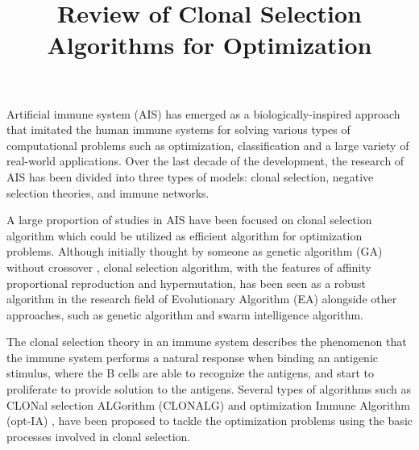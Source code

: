 \documentclass[12pt]{article}
\title{Review of Clonal Selection Algorithms for Optimization}
\date{}
\begin{document}
\onehalfspacing

\maketitle

Artificial immune system (AIS) has emerged as a biologically-inspired  approach that imitated the human immune systems for solving various types of computational problems such as optimization, classification and a large variety of real-world applications. \cite{Castro02ArtificialImmune, Zheng10ASurveyof} Over the last decade of the development, the research of AIS has been divided into three types of models: clonal selection, negative selection theories, and immune networks. \cite{Timmis08TheoreticalAdvances, Hart08Applicationareas}

A large proportion of studies in AIS have been focused on clonal selection algorithm which could be utilized as efficient algorithm for optimization problems. \cite{Timmis07Artificialimmune} Although initially thought by someone as genetic algorithm (GA) without crossover \cite{Hofmeyr00Architecturefor}, clonal selection algorithm, with the features of affinity proportional reproduction and hypermutation, has been seen as a robust algorithm in the research field of Evolutionary Algorithm (EA) alongside other approaches, such as genetic algorithm and swarm intelligence algorithm. \cite{deCastro00TheClonalSelection, deCastro02Learningand}

The clonal selection theory \cite{Burnet59Theclonalselection} in an immune system describes the phenomenon that the immune system performs a natural response when binding an antigenic stimulus, where the B cells are able to recognize the antigens, and start to proliferate to provide solution to the antigens. Several types of algorithms such as CLONal selection ALGorithm (CLONALG) \cite{deCastro02Learningand} and optimization Immune Algorithm (opt-IA) \cite{Cutello06exploring}, have been proposed to tackle the optimization problems using the basic processes involved in clonal selection.
\end{document}
